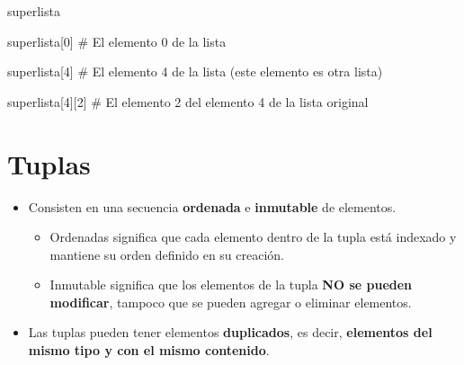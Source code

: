 \documentclass[
  letterpaper,
  DIV=11,
  numbers=noendperiod]{scrreprt}
\newenvironment{Shaded}{\begin{snugshade}}{\end{snugshade}}
\newcommand{\CommentTok}[1]{\textcolor[rgb]{0.37,0.37,0.37}{#1}}
\newcommand{\DecValTok}[1]{\textcolor[rgb]{0.68,0.00,0.00}{#1}}
\newcommand{\NormalTok}[1]{\textcolor[rgb]{0.00,0.23,0.31}{#1}}
\providecommand{\tightlist}{%
  \setlength{\itemsep}{0pt}\setlength{\parskip}{0pt}}\usepackage{longtable,booktabs,array}
\begin{document}
\begin{Shaded}
\begin{Highlighting}[]
\NormalTok{superlista}
\end{Highlighting}
\end{Shaded}

\begin{Shaded}
\begin{Highlighting}[]
\NormalTok{superlista[}\DecValTok{0}\NormalTok{] }\CommentTok{\# El elemento 0 de la lista}
\end{Highlighting}
\end{Shaded}

\begin{Shaded}
\begin{Highlighting}[]
\NormalTok{superlista[}\DecValTok{4}\NormalTok{] }\CommentTok{\# El elemento 4 de la lista (este elemento es otra lista)}
\end{Highlighting}
\end{Shaded}

\begin{Shaded}
\begin{Highlighting}[]
\NormalTok{superlista[}\DecValTok{4}\NormalTok{][}\DecValTok{2}\NormalTok{] }\CommentTok{\# El elemento 2 del elemento 4 de la lista original}
\end{Highlighting}
\end{Shaded}


\chapter{Tuplas}\label{tuplas}

\begin{itemize}
\tightlist
\item
  Consisten en una secuencia \textbf{ordenada} e \textbf{inmutable} de
  elementos.

  \begin{itemize}
  \tightlist
  \item
    Ordenadas significa que cada elemento dentro de la tupla está
    indexado y mantiene su orden definido en su creación.
  \item
    Inmutable significa que los elementos de la tupla \textbf{NO se
    pueden modificar}, tampoco que se pueden agregar o eliminar
    elementos.
  \end{itemize}
\item
  Las tuplas pueden tener elementos \textbf{duplicados}, es decir,
  \textbf{elementos del mismo tipo y con el mismo contenido}.
\end{itemize}
\end{document}
